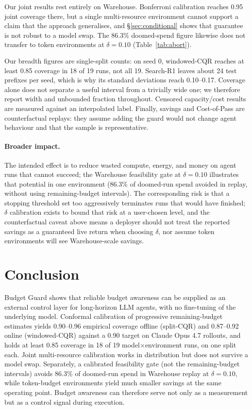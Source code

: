 \documentclass{article}
\newcommand{\bg}{Budget Guard}
\begin{document}
Our joint results rest entirely on Warehouse. Bonferroni calibration reaches 0.95 joint
coverage there, but a single multi-resource environment cannot support a claim that the
approach generalises, and \S\ref{sec:conditional} shows that guarantee is not robust to
a model swap. The 86.3\% doomed-spend figure likewise does not transfer to token
environments at $\delta{=}0.10$ (Table~\ref{tab:abort}).

Our breadth figures are single-split counts: on seed 0, windowed-CQR reaches at least
0.85 coverage in 18 of 19 runs, not all 19. Search-R1 leaves about 24 test prefixes per
seed, which is why its standard deviations reach 0.10--0.17. Coverage alone does not
separate a useful interval from a trivially wide one; we therefore report width and
unbounded fraction throughout. Censored capacity/cost results are measured against an
interpolated label. Finally, savings and Cost-of-Pass are counterfactual replays: they
assume adding the guard would not change agent behaviour and that the sample is
representative.

\paragraph{Broader impact.} The intended effect is to reduce wasted compute, energy,
and money on agent runs that cannot succeed; the Warehouse feasibility gate at
$\delta{=}0.10$ illustrates that potential in one environment (86.3\% of doomed-run
spend avoided in replay, without using remaining-budget intervals). The corresponding
risk is that a stopping threshold set too aggressively terminates runs that would have
finished; $\delta$ calibration exists to bound that risk at a user-chosen level, and
the counterfactual caveat above means a deployer should not treat the reported savings
as a guaranteed live return when choosing $\delta$, nor assume token environments will
see Warehouse-scale savings.

\section{Conclusion}
\label{sec:conclusion}

\bg{} shows that reliable budget awareness can be supplied as an external control layer
for long-horizon LLM agents, with no fine-tuning of the underlying model. Conformal
calibration of progressive remaining-budget estimates yields 0.90--0.96 empirical
coverage offline (split-CQR) and 0.87--0.92 online (windowed-CQR) against a 0.90 target
on Claude Opus 4.7 rollouts, and holds at least 0.85 coverage in 18 of 19
model$\times$environment runs, on one split each. Joint multi-resource calibration
works in distribution but does not survive a model swap. Separately, a calibrated
feasibility gate (not the remaining-budget intervals) avoids 86.3\% of doomed-run spend
in Warehouse replay at $\delta{=}0.10$, while token-budget environments yield much
smaller savings at the same operating point. Budget awareness can therefore serve not
only as a measurement but as a control signal during execution.
\end{document}
